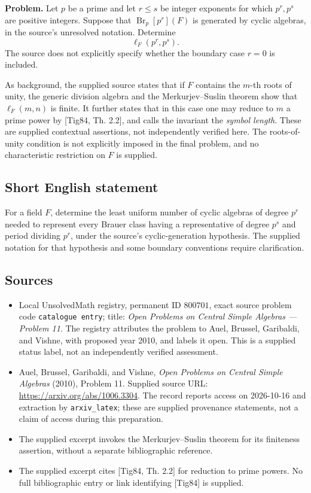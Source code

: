 \documentclass[11pt]{article}
\begin{document}
\textbf{Problem.} Let \(p\) be a prime and let \(r\leq s\) be integer exponents for which \(p^r,p^s\) are positive integers. Suppose that \(\operatorname{Br}_p[p^r](F)\) is generated by cyclic algebras, in the source's unresolved notation. Determine
\[
\ell_F(p^r,p^s).
\]
The source does not explicitly specify whether the boundary case \(r=0\) is included.

As background, the supplied source states that if \(F\) contains the \(m\)-th roots of unity, the generic division algebra and the Merkurjev--Suslin theorem show that \(\ell_F(m,n)\) is finite. It further states that in this case one may reduce to \(m\) a prime power by [Tig84, Th. 2.2], and calls the invariant the \emph{symbol length}. These are supplied contextual assertions, not independently verified here. The roots-of-unity condition is not explicitly imposed in the final problem, and no characteristic restriction on \(F\) is supplied.
\subsection{Short English statement}
For a field \(F\), determine the least uniform number of cyclic algebras of degree \(p^r\) needed to represent every Brauer class having a representative of degree \(p^s\) and period dividing \(p^r\), under the source's cyclic-generation hypothesis. The supplied notation for that hypothesis and some boundary conventions require clarification.
\subsection{Sources}
\begin{itemize}
\item Local UnsolvedMath registry, permanent ID \(800701\), exact source problem code \texttt{catalogue entry}; title: \emph{Open Problems on Central Simple Algebras --- Problem 11}. The registry attributes the problem to Auel, Brussel, Garibaldi, and Vishne, with proposed year 2010, and labels it open. This is a supplied status label, not an independently verified assessment.
\item Auel, Brussel, Garibaldi, and Vishne, \emph{Open Problems on Central Simple Algebras} (2010), Problem 11. Supplied source URL: \url{https://arxiv.org/abs/1006.3304}. The record reports access on 2026-10-16 and extraction by \texttt{arxiv\_latex}; these are supplied provenance statements, not a claim of access during this preparation.
\item The supplied excerpt invokes the Merkurjev--Suslin theorem for its finiteness assertion, without a separate bibliographic reference.
\item The supplied excerpt cites [Tig84, Th. 2.2] for reduction to prime powers. No full bibliographic entry or link identifying [Tig84] is supplied.
\end{itemize}
\end{document}
